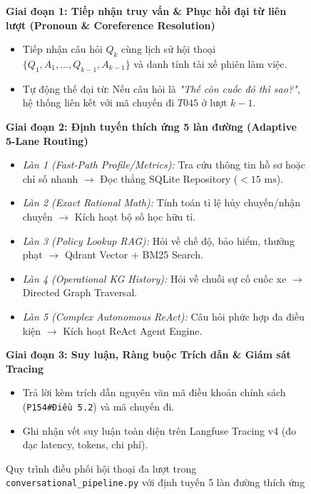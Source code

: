 \documentclass[a4paper,11pt]{article}
\begin{document}
\begin{figure}[htbp]
\centering
\begin{tcolorbox}[
    colback=subtlebg, colframe=brandblue, width=\textwidth,
    title={\small\bfseries\color{white} QUY TRÌNH ĐIỀU PHỐI HỘI THOẠI ĐA LƯỢT TRONG CONVERSATIONAL PIPELINE},
    fonttitle=\bfseries
]
\small
\textbf{Giai đoạn 1: Tiếp nhận truy vấn \& Phục hồi đại từ liên lượt (Pronoun \& Coreference Resolution)}
\begin{itemize}[noitemsep,topsep=2pt]
    \item Tiếp nhận câu hỏi $Q_k$ cùng lịch sử hội thoại $\{Q_1, A_1, \dots, Q_{k-1}, A_{k-1}\}$ và danh tính tài xế phiên làm việc.
    \item Tự động thế đại từ: Nếu câu hỏi là \textit{"Thế còn cuốc đó thì sao?"}, hệ thống liên kết với mã chuyến đi $T045$ ở lượt $k-1$.
\end{itemize}

\vspace{0.15cm}
\textbf{Giai đoạn 2: Định tuyến thích ứng 5 làn đường (Adaptive 5-Lane Routing)}
\begin{itemize}[noitemsep,topsep=2pt]
    \item \textit{Làn 1 (Fast-Path Profile/Metrics):} Tra cứu thông tin hồ sơ hoặc chỉ số nhanh $\to$ Đọc thẳng SQLite Repository ($<15\text{ ms}$).
    \item \textit{Làn 2 (Exact Rational Math):} Tính toán tỉ lệ hủy chuyến/nhận chuyến $\to$ Kích hoạt bộ số học hữu tỉ.
    \item \textit{Làn 3 (Policy Lookup RAG):} Hỏi về chế độ, bảo hiểm, thưởng phạt $\to$ Qdrant Vector + BM25 Search.
    \item \textit{Làn 4 (Operational KG History):} Hỏi về chuỗi sự cố cuốc xe $\to$ Directed Graph Traversal.
    \item \textit{Làn 5 (Complex Autonomous ReAct):} Câu hỏi phức hợp đa điều kiện $\to$ Kích hoạt ReAct Agent Engine.
\end{itemize}

\vspace{0.15cm}
\textbf{Giai đoạn 3: Suy luận, Ràng buộc Trích dẫn \& Giám sát Tracing}
\begin{itemize}[noitemsep,topsep=2pt]
    \item Trả lời kèm trích dẫn nguyên văn mã điều khoản chính sách (\texttt{P154\#Điều 5.2}) và mã chuyến đi.
    \item Ghi nhận vết suy luận toàn diện trên Langfuse Tracing v4 (đo đạc latency, tokens, chi phí).
\end{itemize}
\end{tcolorbox}
\caption{Quy trình điều phối hội thoại đa lượt trong \nolinkurl{conversational_pipeline.py} với định tuyến 5 làn đường thích ứng}
\label{fig:pipeline-flow}
\end{figure}
\end{document}
